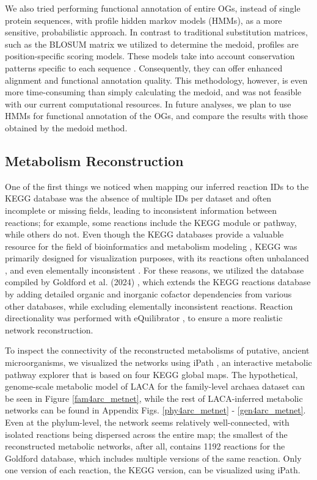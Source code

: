 We also tried performing functional annotation of entire OGs, instead of single protein sequences, with profile hidden markov models (HMMs), as a more sensitive, probabilistic approach. In contrast to traditional substitution matrices, such as the BLOSUM matrix \cite{henikoff1992} we utilized to determine the medoid, profiles are position-specific scoring models. These models take into account conservation patterns specific to each sequence \cite{mount2009, gribskov1987}. Consequently, they can offer enhanced alignment and functional annotation quality. This methodology, however, is even more time-consuming than simply calculating the medoid, and was not feasible with our current computational resources. In future analyses, we plan to use HMMs for functional annotation of the OGs, and compare the results with those obtained by the medoid method.

\subsection*{Metabolism Reconstruction}


One of the first things we noticed when mapping our inferred reaction IDs to the KEGG database was the absence of multiple IDs per dataset and often incomplete or missing fields, leading to inconsistent information between reactions; for example, some reactions include the KEGG module or pathway, while others do not. Even though the KEGG databases provide a valuable resource for the field of bioinformatics and metabolism modeling \cite{kanehisa2000}, KEGG was primarily designed for visualization purposes, with its reactions often unbalanced \cite{wrzodek2013}, and even elementally inconsistent \cite{goldford2024}. For these reasons, we utilized the database compiled by Goldford et al. (2024) \cite{goldford2024}, which extends the KEGG reactions database by adding detailed organic and inorganic cofactor dependencies from various other databases, while excluding elementally inconsistent reactions. Reaction directionality was performed with eQuilibrator \cite{beber2022}, to ensure a more realistic network reconstruction.

To inspect the connectivity of the reconstructed metabolisms of putative, ancient microorganisms, we visualized the networks using iPath \cite{darzi2018}, an interactive metabolic pathway explorer that is based on four KEGG global maps. The hypothetical, genome-scale metabolic model of LACA for the family-level archaea dataset can be seen in Figure \ref{fam4arc_metnet}, while the rest of LACA-inferred metabolic networks can be found in Appendix Figs. \ref{phy4arc_metnet} - \ref{gen4arc_metnet}. Even at the phylum-level, the network seems relatively well-connected, with isolated reactions being dispersed across the entire map; the smallest of the reconstructed metabolic networks, after all, contains 1192 reactions for the Goldford database, which includes multiple versions of the same reaction. Only one version of each reaction, the KEGG version, can be visualized using iPath. 

